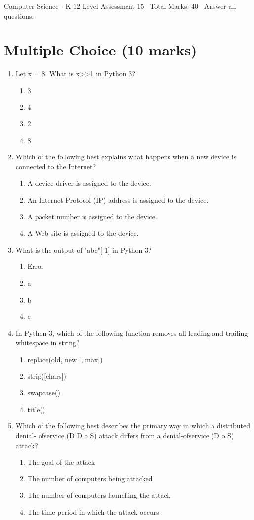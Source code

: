 \documentclass[12pt]{article}
\begin{document}
\begin{center}
Computer Science - K-12 Level Assessment 15 \
Total Marks: 40 \
Answer all questions.
\end{center}

\section*{Multiple Choice (10 marks)}
\begin{enumerate}[label=\arabic*.]
\item Let x = 8. What is x\textgreater{}\textgreater{}1 in Python 3?
\begin{enumerate}[label=(\alph*)]
    \item 3
    \item 4
    \item 2
    \item 8
\end{enumerate}
\item Which of the following best explains what happens when a new device is connected to the Internet?
\begin{enumerate}[label=(\alph*)]
    \item A device driver is assigned to the device.
    \item An Internet Protocol (IP) address is assigned to the device.
    \item A packet number is assigned to the device.
    \item A Web site is assigned to the device.
\end{enumerate}
\item What is the output of "abc"[-1] in Python 3?
\begin{enumerate}[label=(\alph*)]
    \item Error
    \item a
    \item b
    \item c
\end{enumerate}
\item In Python 3, which of the following function removes all leading and trailing whitespace in string?
\begin{enumerate}[label=(\alph*)]
    \item replace(old, new [, max])
    \item strip([chars])
    \item swapcase()
    \item title()
\end{enumerate}
\item Which of the following best describes the primary way in which a distributed denial- ofservice (D D o S) attack differs from a denial-ofservice (D o S) attack?
\begin{enumerate}[label=(\alph*)]
    \item The goal of the attack
    \item The number of computers being attacked
    \item The number of computers launching the attack
    \item The time period in which the attack occurs
\end{enumerate}
\end{enumerate}
\end{document}

